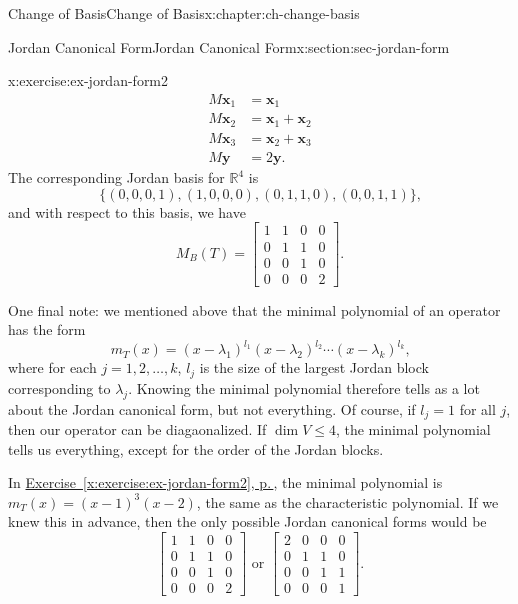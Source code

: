 \documentclass[oneside,10pt,]{book}
\newcommand{\xreffont}{\relax}
\numberwithin{equation}{section}
\newcommand{\bbm}{\begin{bmatrix}}
\newcommand{\ebm}{\end{bmatrix}}
\newcommand{\R}{\mathbb{R}}
\newcommand{\xx}{\mathbf{x}}
\newcommand{\yy}{\mathbf{y}}
\newcommand{\amp}{&}
\begin{document}
\begin{chapterptx}{Change of Basis}{}{Change of Basis}{}{}{x:chapter:ch-change-basis}
\begin{sectionptx}{Jordan Canonical Form}{}{Jordan Canonical Form}{}{}{x:section:sec-jordan-form}
\begin{inlineexercise}{}{x:exercise:ex-jordan-form2}
\begin{align*}
M\xx_1 \amp =\xx_1\\
M\xx_2 \amp =\xx_1+\xx_2\\
M\xx_3 \amp= \xx_2+\xx_3\\
M\yy \amp = 2\yy\text{.}
\end{align*}
The corresponding Jordan basis for \(\R^4\) is%
\begin{equation*}
\{(0,0,0,1),(1,0,0,0),(0,1,1,0),(0,0,1,1)\}\text{,}
\end{equation*}
and with respect to this basis, we have%
\begin{equation*}
M_B(T) = \bbm 1\amp 1\amp 0\amp 0\\
0\amp 1\amp 1\amp 0\\
0\amp 0\amp 1\amp 0\\
0\amp 0\amp 0\amp 2\ebm\text{.}
\end{equation*}
%
\end{inlineexercise}%
One final note: we mentioned above that the minimal polynomial of an operator has the form%
\begin{equation*}
m_T(x)=(x-\lambda_1)^{l_1}(x-\lambda_2)^{l_2}\cdots (x-\lambda_k)^{l_k}\text{,}
\end{equation*}
where for each \(j=1,2,\ldots, k\), \(l_j\) is the size of the largest Jordan block corresponding to \(\lambda_j\). Knowing the minimal polynomial therefore tells as a lot about the Jordan canonical form, but not everything. Of course, if \(l_j=1\) for all \(j\), then our operator can be diagaonalized. If \(\dim V\leq 4\), the minimal polynomial tells us everything, except for the order of the Jordan blocks.%
\par
In \hyperref[x:exercise:ex-jordan-form2]{Exercise~{\xreffont\ref{x:exercise:ex-jordan-form2}}, p.\,\pageref{x:exercise:ex-jordan-form2}}, the minimal polynomial is \(m_T(x)=(x-1)^3(x-2)\), the same as the characteristic polynomial. If we knew this in advance, then the only possible Jordan canonical forms would be%
\begin{equation*}
\bbm 1\amp 1\amp 0\amp 0\\
0\amp 1\amp 1\amp 0\\
0\amp 0\amp 1\amp 0\\
0\amp 0\amp 0\amp 2\ebm \text{ or } \bbm 2\amp 0\amp 0\amp 0\\
0\amp 1\amp 1\amp 0\\
0\amp 0\amp 1\amp 1\\
0\amp 0\amp 0\amp 1\ebm\text{.}
\end{equation*}

\end{sectionptx}
\end{chapterptx}
\end{document}
